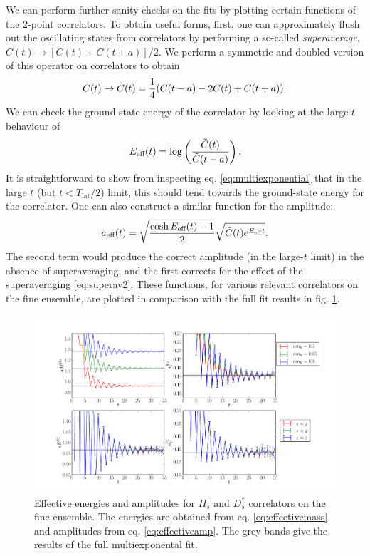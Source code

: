 We can perform further sanity checks on the fits by plotting certain functions of the 2-point correlators. To obtain useful forms, first, one can approximately flush out the oscillating states from correlators by performing a so-called {\it{superaverage}}, $C(t) \to [ C(t) + C(t+a) ]/2$. We perform a symmetric and doubled version of this operator on correlators to obtain
\begin{align}
  C(t) \to \tilde{C}(t) = {1\over 4}( C(t-a) - 2C(t) + C(t+a) ).
  \label{eq:superav2}
\end{align}
We can check the ground-state energy of the correlator by looking at the large-$t$ behaviour of
\begin{align}
  E_{\text{eff}}(t) = \log\left({ \tilde{C}(t)\over \tilde{C}(t-a) }\right).
  \label{eq:effectivemass}
\end{align}
It is straightforward to show from inspecting eq. \eqref{eq:multiexponential} that in the large $t$ (but $t < T_{\text{lat}}/2$) limit, this should tend towards the ground-state energy for the correlator. One can also construct a similar function for the amplitude:
\begin{align}
  a_{\text{eff}}(t) = \sqrt{\cosh E_{\text{eff}}(t)-1\over 2} \sqrt{ \tilde{C}(t) e^{E_{\text{eff}}t} }.
  \label{eq:effectiveamp}
\end{align}
The second term would produce the correct amplitude (in the large-$t$ limit) in the absence of superaveraging, and the first corrects for the effect of the superaveraging \eqref{eq:superav2}. These functions, for various relevant correlators on the fine ensemble, are plotted in comparison with the full fit results in fig. \ref{fig:2pt-summary_BsDsstar}.

\begin{figure}[htb!]
  \begin{center}
  \includegraphics[width=1.1\textwidth]{images/BsDsstar/2ptsummary_fine.pdf}
  \caption{Effective energies and amplitudes for $H_s$ and $D_s^*$ correlators on the fine ensemble. The energies are obtained from eq. \eqref{eq:effectivemass}, and amplitudes from eq. \eqref{eq:effectiveamp}. The grey bands give the results of the full multiexponental fit. \label{fig:2pt-summary_BsDsstar}}
  \end{center}
\end{figure}

